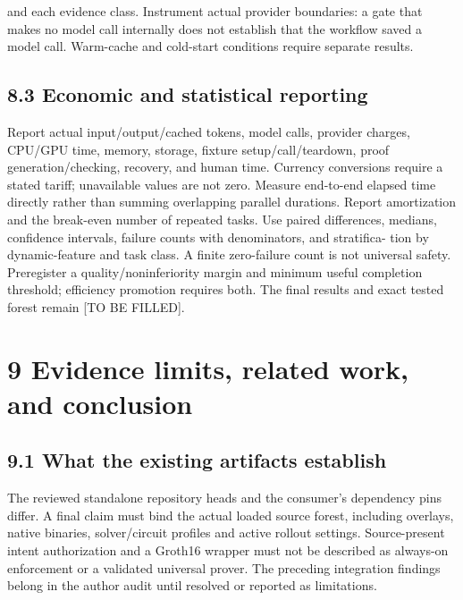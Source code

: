 and each evidence class. Instrument actual provider boundaries: a gate that makes no model call
internally does not establish that the workflow saved a model call. Warm-cache and cold-start
conditions require separate results.



\subsection*{8.3 Economic and statistical reporting}

Report actual input/output/cached tokens, model calls, provider charges, CPU/GPU time, memory,
storage, fixture setup/call/teardown, proof generation/checking, recovery, and human time. Currency
conversions require a stated tariff; unavailable values are not zero. Measure end-to-end elapsed time
directly rather than summing overlapping parallel durations. Report amortization and the break-even
number of repeated tasks.
Use paired differences, medians, confidence intervals, failure counts with denominators, and stratifica-
tion by dynamic-feature and task class. A finite zero-failure count is not universal safety. Preregister
a quality/noninferiority margin and minimum useful completion threshold; efficiency promotion
requires both. The final results and exact tested forest remain [TO BE FILLED].


\section*{9 Evidence limits, related work, and conclusion}
\subsection*{9.1 What the existing artifacts establish}

The reviewed standalone repository heads and the consumer’s dependency pins differ. A final claim
must bind the actual loaded source forest, including overlays, native binaries, solver/circuit profiles
and active rollout settings. Source-present intent authorization and a Groth16 wrapper must not
be described as always-on enforcement or a validated universal prover. The preceding integration
findings belong in the author audit until resolved or reported as limitations.

